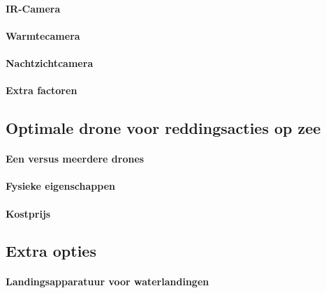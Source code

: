 \lipsum[1-2]

\paragraph{IR-Camera}

\lipsum[1-2]

\paragraph{Warmtecamera}

\lipsum[1-2]

\paragraph{Nachtzichtcamera}

\lipsum[1-2]

\paragraph{Extra factoren}

\lipsum[1-2]

\subsection{Optimale drone voor reddingsacties op zee}

\paragraph{Een versus meerdere drones}

\lipsum[1-2]

\paragraph{Fysieke eigenschappen}

\lipsum[1-2]

\paragraph{Kostprijs}

\lipsum[1-2]

\subsection{Extra opties}

\paragraph{Landingsapparatuur voor waterlandingen}

